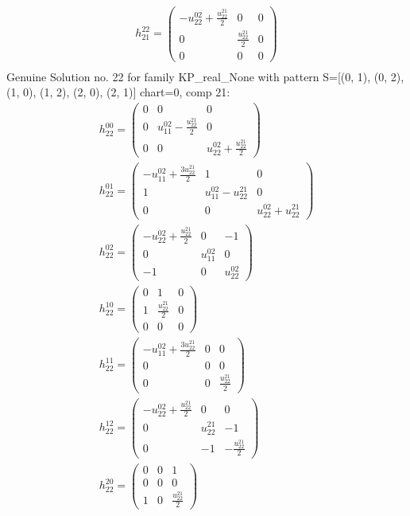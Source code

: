 \documentclass[a4paper, 11pt, twoside, onecolumn]{article}
\begin{document}
\begin{landscape}
\begin{gather*}
	 h_{21}^{22}=\begin{pmatrix}- u^{02}_{22} + \frac{u^{21}_{22}}{2} & 0 & 0\\0 & \frac{u^{21}_{22}}{2} & 0\\0 & 0 & 0\end{pmatrix}\\ 
\end{gather*} 
Genuine Solution no. 22 for family KP_real_None with pattern S=[(0, 1), (0, 2), (1, 0), (1, 2), (2, 0), (2, 1)] chart=0, comp 21: 
\begin{gather*} 
	 h_{22}^{00}=\begin{pmatrix}0 & 0 & 0\\0 & u^{02}_{11} - \frac{u^{21}_{22}}{2} & 0\\0 & 0 & u^{02}_{22} + \frac{u^{21}_{22}}{2}\end{pmatrix}\\ 
	 h_{22}^{01}=\begin{pmatrix}- u^{02}_{11} + \frac{3 u^{21}_{22}}{2} & 1 & 0\\1 & u^{02}_{11} - u^{21}_{22} & 0\\0 & 0 & u^{02}_{22} + u^{21}_{22}\end{pmatrix}\\ 
	 h_{22}^{02}=\begin{pmatrix}- u^{02}_{22} + \frac{u^{21}_{22}}{2} & 0 & -1\\0 & u^{02}_{11} & 0\\-1 & 0 & u^{02}_{22}\end{pmatrix}\\ 
	 h_{22}^{10}=\begin{pmatrix}0 & 1 & 0\\1 & \frac{u^{21}_{22}}{2} & 0\\0 & 0 & 0\end{pmatrix}\\ 
	 h_{22}^{11}=\begin{pmatrix}- u^{02}_{11} + \frac{3 u^{21}_{22}}{2} & 0 & 0\\0 & 0 & 0\\0 & 0 & \frac{u^{21}_{22}}{2}\end{pmatrix}\\ 
	 h_{22}^{12}=\begin{pmatrix}- u^{02}_{22} + \frac{u^{21}_{22}}{2} & 0 & 0\\0 & u^{21}_{22} & -1\\0 & -1 & - \frac{u^{21}_{22}}{2}\end{pmatrix}\\ 
	 h_{22}^{20}=\begin{pmatrix}0 & 0 & 1\\0 & 0 & 0\\1 & 0 & \frac{u^{21}_{22}}{2}\end{pmatrix}\\ 

\end{gather*}
\end{landscape}
\end{document}
